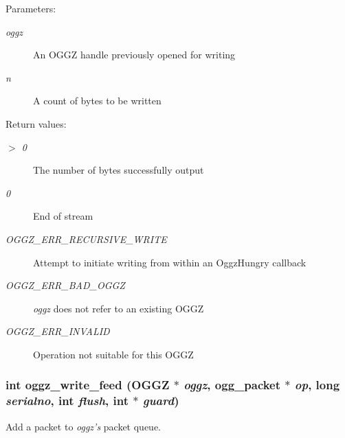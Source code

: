 \begin{Desc}
\item[Parameters:]
\begin{description}
\item[{\em oggz}]An OGGZ handle previously opened for writing \item[{\em n}]A count of bytes to be written \end{description}
\end{Desc}
\begin{Desc}
\item[Return values:]
\begin{description}
\item[{\em $>$ 0}]The number of bytes successfully output \item[{\em 0}]End of stream \item[{\em OGGZ\_\-ERR\_\-RECURSIVE\_\-WRITE}]Attempt to initiate writing from within an Oggz\-Hungry callback \item[{\em OGGZ\_\-ERR\_\-BAD\_\-OGGZ}]{\em oggz\/} does not refer to an existing OGGZ \item[{\em OGGZ\_\-ERR\_\-INVALID}]Operation not suitable for this OGGZ \end{description}
\end{Desc}
\subsubsection{\setlength{\rightskip}{0pt plus 5cm}int oggz\_\-write\_\-feed ({\bf OGGZ} $\ast$ {\em oggz}, ogg\_\-packet $\ast$ {\em op}, long {\em serialno}, int {\em flush}, int $\ast$ {\em guard})}\label{group__write__api_ga2}


Add a packet to {\em oggz's\/} packet queue. 

